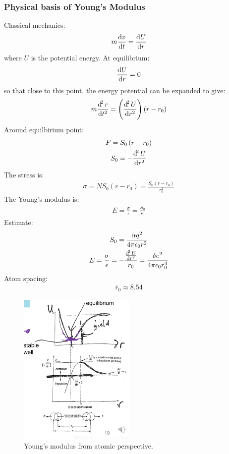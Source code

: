 \subsubsection{Physical basis of Young's Modulus}
Classical mechanics:
\begin{gather}
	m\frac{\dif v}{\dif t} = \frac{\dif U }{\dif r}
\end{gather}
where $U$ is the potential energy. At equilibrium:
\begin{gather}
	\frac{\dif U}{\dif r } = 0
\end{gather}
so that close to this point, the energy potential can be expanded to give:
\begin{gather}
	m \frac{\dif^2 r }{\dif t^2} = \left(\frac{\dif^2 U}{\dif r^2}\right)\left(r-r_0\right)
\end{gather}
Around equilbirium point:
\begin{gather}
	F = S_0 \left(r - r_0\right)\\
	S_0 = -\frac{\dif^2 U}{\dif r^2}
\end{gather}
The stress is:
\begin{gather}
	\sigma = N S_0 \left(r - r_0\right) = \frac{S_0\left(r-r_0\right)}{r_0^2}
\end{gather}
The Young's modulus is:
\begin{gather}
	E = \frac{\sigma}{\epsilon} = \frac{S_0}{r_0}
\end{gather}
Estimate:
\begin{gather}
	S_0 = \frac{\alpha q^2}{4\pi\epsilon_0r^2}\\
	E = \frac{\sigma}{\epsilon} = - \frac{\frac{\dif^2 U}{\dif r^2}}{r_0} = \frac{\delta e^2}{4\pi\epsilon_0r_0^4}
\end{gather}
Atom spacing:
\begin{gather}
	\overline{r}_0 \approx 8.54
\end{gather}
\begin{figure}[H]
	\centering
	\includegraphics[width = 0.5\textwidth]{./img/figure12.png}
	\caption{Young's modulus from atomic perspective.}
\end{figure}
